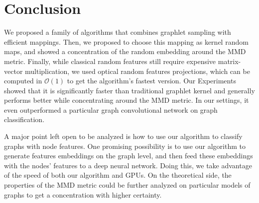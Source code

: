 \documentclass{article}
\begin{document}
\section{Conclusion}
\label{sec:Conclusion}
We proposed a family of algorithms that combines graphlet sampling with efficient mappings. Then, we proposed to choose this mapping as kernel random maps, and showed a concentration of the random embedding around the MMD metric. Finally, while classical random features still require expensive matrix-vector multiplication, we used optical random features projections, which can be computed in $\mathcal{O}(1)$ to get the algorithm's fastest version. Our Experiments showed that it is significantly faster than traditional graphlet kernel and generally performs better while concentrating around the MMD metric. In our settings, it even outperformed a particular graph convolutional network on graph classification.

 A major point left open to be analyzed is how to use our algorithm to classify graphs with node features. One promising possibility is to use our algorithm to generate features embeddings on the graph level, and then feed these embeddings with the nodes' features to a deep neural network. Doing this, we take advantage of the speed of both our algorithm and GPUs. On the theoretical side, the properties of the MMD metric could be further analyzed on particular models of graphs to get a concentration with higher certainty. 







\end{document}
